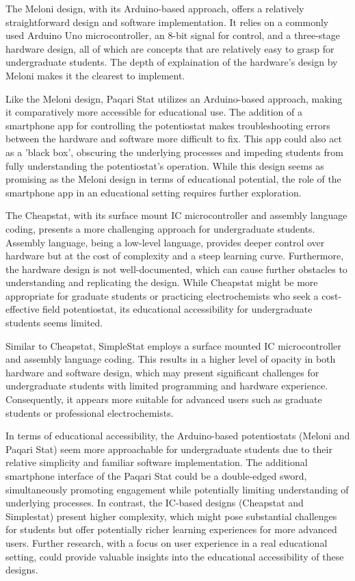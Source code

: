 \documentclass{article}
\begin{document}
The Meloni design, with its Arduino-based approach, offers a relatively straightforward design and software implementation. It relies on a commonly used Arduino Uno microcontroller, an 8-bit signal for control, and a three-stage hardware design, all of which are concepts that are relatively easy to grasp for undergraduate students. The depth of explaination of the hardware's design by Meloni makes it the clearest to implement.

Like the Meloni design, Paqari Stat utilizes an Arduino-based approach, making it comparatively more accessible for educational use. The addition of a smartphone app for controlling the potentiostat makes troubleshooting errors between the hardware and software more difficult to fix. This app could also act as a 'black box', obscuring the underlying processes and impeding students from fully understanding the potentiostat's operation. While this design seems as promising as the Meloni design in terms of educational potential, the role of the smartphone app in an educational setting requires further exploration.

The Cheapstat, with its surface mount IC microcontroller and assembly language coding, presents a more challenging approach for undergraduate students. Assembly language, being a low-level language, provides deeper control over hardware but at the cost of complexity and a steep learning curve. Furthermore, the hardware design is not well-documented, which can cause further obstacles to understanding and replicating the design. While Cheapstat might be more appropriate for graduate students or practicing electrochemists who seek a cost-effective field potentiostat, its educational accessibility for undergraduate students seems limited.

Similar to Cheapstat, SimpleStat employs a surface mounted IC microcontroller and assembly language coding. This results in a higher level of opacity in both hardware and software design, which may present significant challenges for undergraduate students with limited programming and hardware experience. Consequently, it appears more suitable for advanced users such as graduate students or professional electrochemists.

In terms of educational accessibility, the Arduino-based potentiostats (Meloni and Paqari Stat) seem more approachable for undergraduate students due to their relative simplicity and familiar software implementation. The additional smartphone interface of the Paqari Stat could be a double-edged sword, simultaneously promoting engagement while potentially limiting understanding of underlying processes. In contrast, the IC-based designs (Cheapstat and Simplestat) present higher complexity, which might pose substantial challenges for students but offer potentially richer learning experiences for more advanced users. Further research, with a focus on user experience in a real educational setting, could provide valuable insights into the educational accessibility of these designs.
\end{document}
